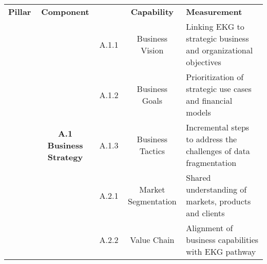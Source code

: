 \begin{table}[ht]
    \centering\fontsize{7pt}{8pt}\selectfont
    \begin{tabular}{@{}cclcl@{}}
    \textbf{Pillar}                                                       & \textbf{Component}                                                                 &                               & \textbf{Capability}                                  & \textbf{Measurement}                                                                           \\ %
    \cellcolor[HTML]{548135}{}                                            & \cellcolor[HTML]{A8D08D}                                                           & \cellcolor[HTML]{C5E0B3}A.1.1 & \cellcolor[HTML]{C5E0B3}Business Vision              & \cellcolor[HTML]{E2EFD9}Linking EKG to strategic business and organizational objectives        \\
    \cellcolor[HTML]{548135}{}                                            & \cellcolor[HTML]{A8D08D}                                                           & \cellcolor[HTML]{C5E0B3}A.1.2 & \cellcolor[HTML]{C5E0B3}Business Goals               & \cellcolor[HTML]{E2EFD9}Prioritization of strategic use cases and financial models             \\
    \cellcolor[HTML]{548135}{}                                            & \multirow{-3}{*}{\cellcolor[HTML]{A8D08D}\textbf{A.1 Business Strategy}}           & \cellcolor[HTML]{C5E0B3}A.1.3 & \cellcolor[HTML]{C5E0B3}Business Tactics             & \cellcolor[HTML]{E2EFD9}Incremental steps to address the challenges of data fragmentation      \\
    \cellcolor[HTML]{548135}{}                                            & \cellcolor[HTML]{A8D08D}                                                           & \cellcolor[HTML]{C5E0B3}A.2.1 & \cellcolor[HTML]{C5E0B3}Market Segmentation          & \cellcolor[HTML]{E2EFD9}Shared understanding of markets, products and clients                  \\
    \cellcolor[HTML]{548135}{}                                            & \cellcolor[HTML]{A8D08D}                                                           & \cellcolor[HTML]{C5E0B3}A.2.2 & \cellcolor[HTML]{C5E0B3}Value Chain                  & \cellcolor[HTML]{E2EFD9}Alignment of business capabilities with EKG pathway                    \\

\end{tabular}
\end{table}
